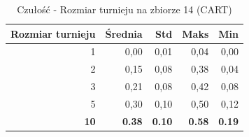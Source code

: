 \begin{table}[htbp]
\centering
\small
\setlength{\tabcolsep}{6pt}
\renewcommand{\arraystretch}{1.2}
\caption{Czułość - Rozmiar turnieju na zbiorze 14 (CART)}
\label{tab:CART_tournament_size_14_recall}
\begin{tabular}{r|r|r|r|r}
\toprule
Rozmiar turnieju & Średnia & Std & Maks & Min \\
\hline
1 & 0,00 & 0,01 & 0,04 & 0,00 \\
2 & 0,15 & 0,08 & 0,38 & 0,04 \\
3 & 0,21 & 0,08 & 0,42 & 0,08 \\
5 & 0,30 & 0,10 & 0,50 & 0,12 \\
\textbf{10} & \textbf{0.38} & \textbf{0.10} & \textbf{0.58} & \textbf{0.19} \\
\bottomrule
\end{tabular}
\end{table}